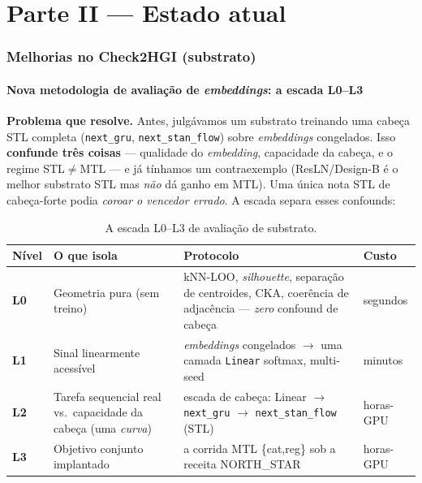 \documentclass[11pt,a4paper]{article}
\begin{document}
\part*{Parte II --- Estado atual}

\section{Melhorias no Check2HGI (substrato)}\label{sec:c2hgi}

\subsection{Nova metodologia de avaliação de \textit{embeddings}: a escada L0--L3}\label{sec:l0l3}

\textbf{Problema que resolve.} Antes, julgávamos um substrato treinando uma cabeça STL completa
(\texttt{next\_gru}, \texttt{next\_stan\_flow}) sobre \textit{embeddings} congelados. Isso
\textbf{confunde três coisas} --- qualidade do \textit{embedding}, capacidade da cabeça, e o regime
STL$\neq$MTL --- e já tínhamos um contraexemplo (ResLN/Design-B é o melhor substrato STL mas
\emph{não} dá ganho em MTL). Uma única nota STL de cabeça-forte podia \emph{coroar o vencedor errado}.
A escada separa esses confounds:

\begin{table}[H]
\centering
\footnotesize
\caption{A escada L0--L3 de avaliação de substrato.}
\renewcommand{\arraystretch}{1.2}
\begin{tabular}{p{0.7cm}p{3.2cm}p{6.0cm}p{4.0cm}}
\toprule
\textbf{Nível} & \textbf{O que isola} & \textbf{Protocolo} & \textbf{Custo} \\
\midrule
\textbf{L0} & Geometria pura (sem treino) & kNN-LOO, \textit{silhouette}, separação de centroides, CKA, coerência de adjacência --- \emph{zero} confound de cabeça & segundos \\
\textbf{L1} & Sinal linearmente acessível & \textit{embeddings} congelados $\to$ uma camada \texttt{Linear} softmax, multi-seed & minutos \\
\textbf{L2} & Tarefa sequencial real vs.\ capacidade da cabeça (uma \emph{curva}) & escada de cabeça: Linear $\to$ \texttt{next\_gru} $\to$ \texttt{next\_stan\_flow} (STL) & horas-GPU \\
\textbf{L3} & Objetivo conjunto implantado & a corrida MTL \{cat,reg\} sob a receita NORTH\_STAR & horas-GPU \\
\bottomrule
\end{tabular}
\end{table}
\end{document}
